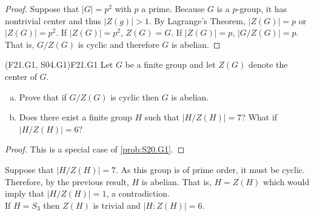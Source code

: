 \documentclass[../../AlgebraQualSolutions.tex]{subfiles}
\begin{document}
	\begin{proof}
	Suppose that $|G| = p^2$ with $p$ a prime. Because $G$ is a $p$-group, it has nontrivial center and thus $|Z(g)| > 1$. By Lagrange's Theorem, $|Z(G)| = p$ or $|Z(G)| = p^2$. If $|Z(G)| =p^2$, $Z(G) = G$. If $|Z(G)| = p$, $\left|G/Z(G) \right| = p$. That is, $G/Z(G)$ is cyclic and therefore $G$ is abelian.
	\end{proof}
	
	\begin{prob}{(F21.G1, S04.G1)}{F21.G1}
	Let $G$ be a finite group and let $Z(G)$ denote the center of $G$.
	\begin{enumerate}[(a)]
	\item Prove that if $G/Z(G)$ is cyclic then $G$ is abelian.
	\item Does there exist a finite group $H$ such that $|H/Z(H)| = 7$? What if $|H/Z(H)| = 6$?
	\end{enumerate}
	\end{prob}
	
	\begin{proof}
	This is a special case of \ref{prob:S20.G1}.
	\end{proof}
	
	\begin{solution}
	Suppose that $|H/Z(H)| = 7$. As this group is of prime order, it must be cyclic. Therefore, by the previous result, $H$ is abelian. That is, $H = Z(H)$ which would imply that $|H/Z(H)| = 1$, a contradiction.\\
	
	If $H = S_3$ then $Z(H)$ is trivial and $|H: Z(H)| = 6$.
	\end{solution}
\end{document}
